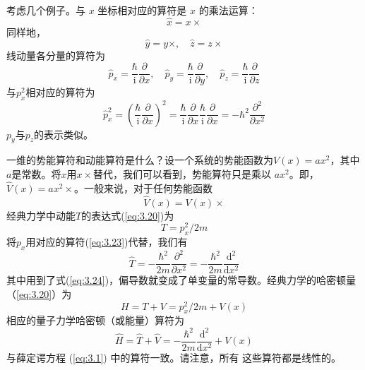 	考虑几个例子。与 $x$ 坐标相对应的算符是 $x$ 的乘法运算：
	\begin{equation}
		\boxed{
			\hat{x} = x \times
		}
		\label{eq:3.21}
	\end{equation}
	同样地，
	\begin{equation}
		\boxed{
			\hat{y} = y \times, \quad \hat{z} = z \times
		}
		\label{eq:3.22}
	\end{equation}
	线动量各分量的算符为
	\begin{equation}
		\boxed{
			\hat{p}_x = \frac{\hbar}{\mathrm{i}}\frac{\partial}{\partial x}, \quad \hat{p}_y = \frac{\hbar}{\mathrm{i}}\frac{\partial}{\partial y}, \quad \hat{p}_z = \frac{\hbar}{\mathrm{i}}\frac{\partial}{\partial z}
		}
		\label{eq:3.23}
	\end{equation}
	与$p_x^2$相对应的算符为
	\begin{equation}
		\hat{p}_x^2 = \left(\frac{\hbar}{\mathrm{i}} \frac{\partial}{\partial x}\right)^2 = \frac{\hbar}{\mathrm{i}} \frac{\partial}{\partial x}\frac{\hbar}{\mathrm{i}} \frac{\partial}{\partial x} = -\hbar^2 \frac{\partial^2}{\partial x^2}
		\label{eq:3.24}
	\end{equation}
	$p_y$与$p_z$的表示类似。

	一维的势能算符和动能算符是什么？设一个系统的势能函数为$V\left(x\right) = ax^2$，其中$a$是常数。将$x$用$x \times$替代，我们可以看到，势能算符只是乘以 $ax^2$。即，$\hat{V}\left(x\right) = ax^2 \times$。一般来说，对于任何势能函数
	\begin{equation}
		\boxed{
			\hat{V}\left(x\right) = V\left(x\right) \times 
		}
		\label{eq:3.25 definition of potential energy operator}
	\end{equation}
	经典力学中动能$T$的表达式(\ref{eq:3.20})为
	\begin{equation}
		\boxed{
			T = p_x^2 / 2m
		}
		\label{eq:3.26}
	\end{equation}
	将$p_x$用对应的算符(\ref{eq:3.23})代替，我们有
	\begin{equation}
		\hat{T} = -\frac{\hbar^2}{2m}\frac{\partial^2}{\partial x^2} = -\frac{\hbar^2}{2m}\frac{\mathrm{d}^2}{\mathrm{d}x^2}
		\label{eq:3.27}
	\end{equation}
	其中用到了式(\ref{eq:3.24})，偏导数就变成了单变量的常导数。经典力学的哈密顿量（\ref{eq:3.20}）为
	\begin{equation}
		H = T + V = p_x^2/2m+V\left(x\right)
		\label{eq:3.28}
	\end{equation}
	相应的量子力学哈密顿（或能量）算符为
	\begin{equation}
		\boxed{
			\hat{H} = \hat{T} + \hat{V} = -\frac{\hbar^2}{2m}\frac{\mathrm{d}^2}{\mathrm{d}x^2}+V\left(x\right)
		}
		\label{eq:3.29}
	\end{equation}
	与薛定谔方程 (\ref{eq:3.1}) 中的算符一致。请注意，所有
	这些算符都是线性的。

